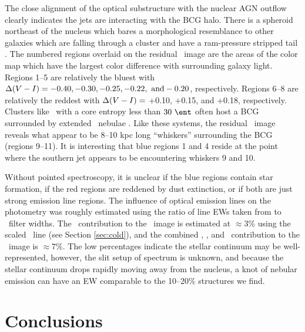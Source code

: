 \documentclass[11pt, preprint]{aastex}
\begin{document}
The close alignment of the optical substructure with the nuclear AGN
outflow clearly indicates the jets are interacting with the BCG
halo. There is a spheroid northeast of the nucleus which bares a
morphological resemblance to other galaxies which are falling through
a cluster and have a ram-pressure stripped tail \citep[see][for
  example]{2007ApJ...671..190S}. The numbered regions overlaid on the
residual \myv\ image are the areas of the color map which have the
largest color difference with surrounding galaxy light. Regions 1--5
are relatively the bluest with $\Delta(V-I) = -0.40, -0.30,
-0.25, -0.22, ~\rm{and} -0.20$, respectively. Regions 6--8 are
relatively the reddest with $\Delta(V-I) =$ +0.10, +0.15, and
+0.18, respectively. Clusters like \rbs\ with a core entropy less than
$30 ~\ent$ often host a BCG surrounded by extended \halpha\ nebulae
\citep[\eg][]{mcdonald10}. Like these systems, the residual
\myi\ image reveals what appear to be 8--10 kpc long ``whiskers''
surrounding the BCG (regions 9--11). It is interesting that blue
regions 1 and 4 reside at the point where the southern jet appears to
be encountering whiskers 9 and 10.

Without pointed spectroscopy, it is unclear if the blue regions
contain star formation, if the red regions are reddened by dust
extinction, or if both are just strong emission line regions. The
influence of optical emission lines on the photometry was roughly
estimated using the ratio of line EWs taken from \citet{rbs1} to
\hst\ filter widths. The \halpha\ contribution to the \myi\ image is
estimated at $\approx 3\%$ using the scaled \hbeta\ line (see Section
\ref{sec:cold}), and the combined \hbeta, \oii, and
\oiii\ contribution to the \myv\ image is $\approx 7\%$. The low
percentages indicate the stellar continuum may be well-represented,
however, the slit setup of \citet{rbs1} spectrum is unknown, and
because the stellar continuum drops rapidly moving away from the
nucleus, a knot of nebular emission can have an EW comparable to the
10--20\% structures we find.

\section{Conclusions}
\label{sec:con}
\end{document}
